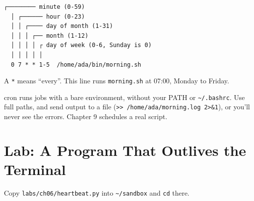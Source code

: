 \begin{codeblock}
\begin{Verbatim}[breaklines=false, fontsize=\fontsize{8.8}{8.68}\selectfont, fontfamily=diagrammono, formatcom=\diagramlines]
  ┌──────── minute (0-59)
  │ ┌────── hour (0-23)
  │ │ ┌──── day of month (1-31)
  │ │ │ ┌── month (1-12)
  │ │ │ │ ┌ day of week (0-6, Sunday is 0)
  │ │ │ │ │
  0 7 * * 1-5  /home/ada/bin/morning.sh
\end{Verbatim}
\end{codeblock}

A \texttt{*} means ``every''. This line runs \texttt{morning.sh} at 07:00, Monday to Friday.

cron runs jobs with a bare environment, without your PATH or \texttt{\textasciitilde{}/.bashrc}. Use full paths, and send output to a file (\texttt{\textgreater{}\textgreater{}\ /}\allowbreak{}\texttt{home/}\allowbreak{}\texttt{ada/}\allowbreak{}\texttt{morning.}\allowbreak{}\texttt{log\ 2\textgreater{}\&}\allowbreak{}\texttt{1}), or you'll never see the errors. Chapter 9 schedules a real script.

\section{Lab: A Program That Outlives the Terminal}\label{06-programs-that-keep-running:lab-a-program-that-outlives-the-terminal}

Copy \texttt{labs/}\allowbreak{}\texttt{ch06/}\allowbreak{}\texttt{heartbeat.py} into \texttt{\textasciitilde{}/sandbox} and \texttt{cd} there.

